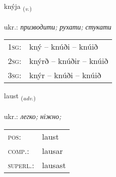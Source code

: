 \documentclass[frontgrid, backgrid]{flacards}\usepackage[]{graphicx}\usepackage[]{xcolor}
\begin{document}
\renewcommand{\flhead}{\vskip5pt \fboxsep=0pt {\small\bfseries\footnotesize Sagnorð | дієслово}}
\renewcommand{\fcfoot}{\vskip5pt \fboxsep=0pt \hspace{2pt}{\small\bfseries\footnotesize 3K}}

\renewcommand{\blhead}{\vskip5pt {\small\bfseries\footnotesize Sagnorð | дієслово }}
\renewcommand{\bcfoot}{\vskip5pt \hspace{2pt}{\small\bfseries\footnotesize 3K}}


{knýja \small{\textsubscript{(\textit{v.})}} \\[1ex] %
\textphonetic{[kʰniːja]} \\
ukr.: \emph{призводити; рухати; стукати} \\  [2ex]
\renewcommand*{\arraystretch}{0.8}
\begin{tabular}{p{1cm}l}
\textsc{1sg}: & kný -- knúði -- knúið \\ 
\textsc{2sg}: & knýrð -- knúðir -- knúið \\ 
\textsc{3sg}: & knýr -- knúði -- knúið \\ 
\end{tabular}
}

\renewcommand{\flhead}{\vskip5pt \fboxsep=0pt {\small\bfseries\footnotesize Atviksorð | прислівник}}
\renewcommand{\fcfoot}{\vskip5pt \fboxsep=0pt \hspace{2pt}{\small\bfseries\footnotesize 3K}}

\renewcommand{\blhead}{\vskip5pt {\small\bfseries\footnotesize Atviksorð | прислівник }}
\renewcommand{\bcfoot}{\vskip5pt \hspace{2pt}{\small\bfseries\footnotesize 3K}}


{laust \small{\textsubscript{(\textit{adv.})}} \\[1ex] %
\textphonetic{[lœist]} \\
ukr.: \emph{легко; ніжно;} \\  [2ex]
\renewcommand*{\arraystretch}{0.8}
\begin{tabular}{ll}
\textsc{pos}: & laust \\ 
\textsc{comp.}: & lausar \\ 
\textsc{superl.}: & lausast \\
\end{tabular}
}
\end{document}
